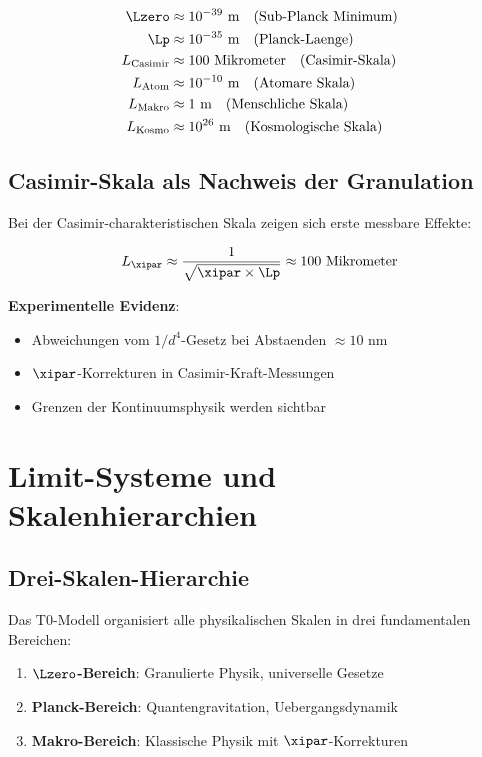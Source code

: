 	\begin{align}
		\Lzero &\approx 10^{-39} \text{ m} \quad \text{(Sub-Planck Minimum)} \\
		\Lp &\approx 10^{-35} \text{ m} \quad \text{(Planck-Laenge)} \\
		L_{\text{Casimir}} &\approx 100 \text{ Mikrometer} \quad \text{(Casimir-Skala)} \\
		L_{\text{Atom}} &\approx 10^{-10} \text{ m} \quad \text{(Atomare Skala)} \\
		L_{\text{Makro}} &\approx 1 \text{ m} \quad \text{(Menschliche Skala)} \\
		L_{\text{Kosmo}} &\approx 10^{26} \text{ m} \quad \text{(Kosmologische Skala)}
	\end{align}
	
	\subsection{Casimir-Skala als Nachweis der Granulation}
	
	Bei der Casimir-charakteristischen Skala zeigen sich erste messbare Effekte:
	
	\begin{equation}
		L_{\xipar} \approx \frac{1}{\sqrt{\xipar \times \Lp}} \approx 100 \text{ Mikrometer}
	\end{equation}
	
	\textbf{Experimentelle Evidenz}:
	\begin{itemize}
		\item Abweichungen vom $1/d^4$-Gesetz bei Abstaenden $\approx 10$ nm
		\item $\xipar$-Korrekturen in Casimir-Kraft-Messungen
		\item Grenzen der Kontinuumsphysik werden sichtbar
	\end{itemize}
	
	\section{Limit-Systeme und Skalenhierarchien}
	
	\subsection{Drei-Skalen-Hierarchie}
	
	Das T0-Modell organisiert alle physikalischen Skalen in drei fundamentalen Bereichen:
	
	\begin{enumerate}
		\item \textbf{$\Lzero$-Bereich}: Granulierte Physik, universelle Gesetze
		\item \textbf{Planck-Bereich}: Quantengravitation, Uebergangsdynamik
		\item \textbf{Makro-Bereich}: Klassische Physik mit $\xipar$-Korrekturen
	\end{enumerate}
	

